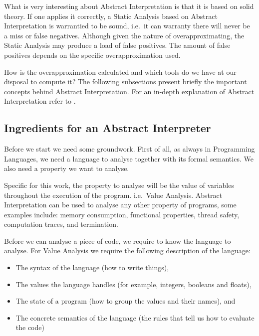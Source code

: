\documentclass[
11pt, %
english, %
singlespacing, %
headsepline, %
]{MastersDoctoralThesis} %
\providecommand{\tightlist}{%
  \setlength{\itemsep}{0pt}\setlength{\parskip}{0pt}}
\begin{document}
What is very interesting about Abstract Interpretation is that it is
based on solid theory. If one applies it correctly, a Static Analysis
based on Abstract Interpretation is warrantied to be sound, i.e.~it can
warranty there will never be a miss or false negatives. Although given
the nature of overapproximating, the Static Analysis may produce a load
of false positives. The amount of false positives depends on the
specific overapproximation used.

How is the overapproximation calculated and which tools do we have at
our disposal to compute it? The following subsections present briefly
the important concepts behind Abstract Interpretation. For an in-depth
explanation of Abstract Interpretation refer to \autocites[Chapters 1
and
4]{nielson2015principles}{cousot_abstract_1977}{nipkow_abstract_2014}.

\hypertarget{ingredients-for-an-abstract-interpreter}{%
\subsection{Ingredients for an Abstract
Interpreter}\label{ingredients-for-an-abstract-interpreter}}

Before we start we need some groundwork. First of all, as always in
Programming Languages, we need a language to analyse together with its
formal semantics. We also need a property we want to analyse.

Specific for this work, the property to analyse will be the value of
variables throughout the execution of the program. i.e.~Value Analysis.
Abstract Interpretation can be used to analyse any other property of
programs, some examples include: memory consumption, functional
properties, thread safety, computation traces, and termination.

Before we can analyse a piece of code, we require to know the language
to analyse. For Value Analysis we require the following description of
the language:

\begin{itemize}
\tightlist
\item
  The syntax of the language (how to write things),
\item
  The values the language handles (for example, integers, booleans and
  floats),
\item
  The state of a program (how to group the values and their names), and
\item
  The concrete semantics of the language (the rules that tell us how to
  evaluate the code)
\end{itemize}
\end{document}
